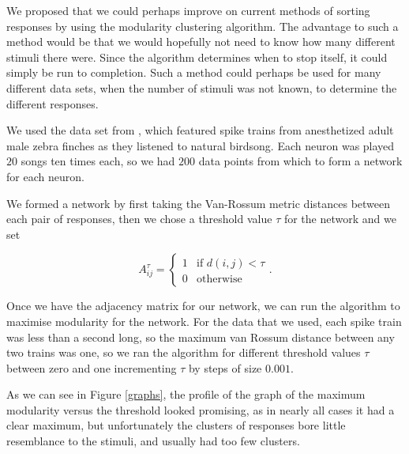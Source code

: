 We proposed that we could perhaps improve on current methods of sorting 
responses by using the modularity clustering algorithm.  The advantage to such 
a method would be that we would hopefully not need to know how many different 
stimuli there were. Since the algorithm determines when to stop itself, it 
could simply be run to completion.  Such a method could perhaps be used for 
many different data sets, when the number of stimuli was not known, to 
determine the different responses.

We used the data set from \cite{NarayanEtAl2006b}, which featured spike trains 
from anesthetized adult male zebra finches as they listened to natural 
birdsong.  Each neuron was played $20$ songs ten times each, so we had $200$ 
data points from which to form a network for each neuron.

We formed a network by first taking the Van-Rossum metric distances between 
each pair of responses, then we chose a threshold value $\tau$ for the network 
and we set

\begin{equation}
A^{\tau}_{ij} = \left\{ \begin{array}{ll} 1 & \mbox{if }d(i,j)<\tau \\
0 & \mbox{otherwise}
\end{array}\right. .
\end{equation}

Once we have the adjacency matrix for our network, we can run the algorithm to 
maximise modularity for the network.  For the data that we used, 
each spike train was less than a second long, so the maximum van Rossum 
distance between any two trains was one, so we ran the algorithm for different 
threshold values $\tau$ between zero and one incrementing $\tau$ by steps of 
size $0.001$.

As we can see in Figure \ref{graphs}, the profile of the graph of the maximum 
modularity versus the threshold looked promising, as in nearly all cases it had 
a clear maximum, but unfortunately the clusters of responses bore little 
resemblance to the stimuli, and usually had too few clusters.


